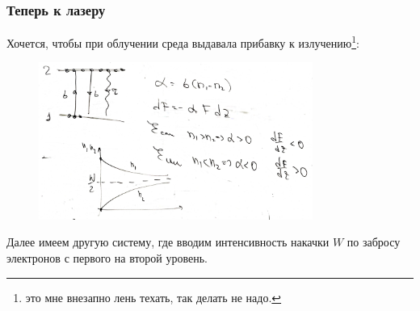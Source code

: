\subsubsection*{Теперь к лазеру}
Хочется, чтобы при облучении среда выдавала прибавку к излучению\footnote{это мне внезапно лень техать, так делать не надо.}: 

\begin{figure}[h]
    \centering
    \includegraphics[width=0.8\textwidth]{img/len_texat1.png}
\end{figure}


Далее имеем другую систему, где вводим интенсивность накачки $W$ по забросу электронов с первого на второй уровень.

